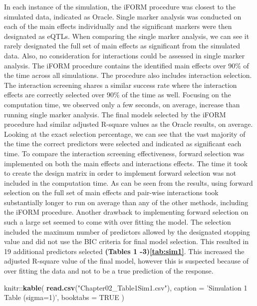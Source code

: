 \documentclass[11pt,]{book}
\newenvironment{Shaded}{\begin{snugshade}}{\end{snugshade}}
\newcommand{\KeywordTok}[1]{\textcolor[rgb]{0.13,0.29,0.53}{\textbf{{#1}}}}
\newcommand{\DataTypeTok}[1]{\textcolor[rgb]{0.13,0.29,0.53}{{#1}}}
\newcommand{\StringTok}[1]{\textcolor[rgb]{0.31,0.60,0.02}{{#1}}}
\newcommand{\OtherTok}[1]{\textcolor[rgb]{0.56,0.35,0.01}{{#1}}}
\newcommand{\NormalTok}[1]{{#1}}
\theoremstyle{definition}
\theoremstyle{definition}
\theoremstyle{remark}
\begin{document}
In each instance of the simulation, the iFORM procedure was closest to
the simulated data, indicated as Oracle. Single marker analysis was
conducted on each of the main effects individually and the significant
markers were then designated as eQTLs. When comparing the single marker
analysis, we can see it rarely designated the full set of main effects
as significant from the simulated data. Also, no consideration for
interactions could be assessed in single marker analysis. The iFORM
procedure contains the identified main effects over 90\% of the time
across all simulations. The procedure also includes interaction
selection. The interaction screening shares a similar success rate where
the interaction effects are correctly selected over 90\% of the time as
well. Focusing on the computation time, we observed only a few seconds,
on average, increase than running single marker analysis. The final
models selected by the iFORM procedure had similar adjusted R-square
values as the Oracle results, on average. Looking at the exact selection
percentage, we can see that the vast majority of the time the correct
predictors were selected and indicated as significant each time. To
compare the interaction screening effectiveness, forward selection was
implemented on both the main effects and interactions effects. The time
it took to create the design matrix in order to implement forward
selection was not included in the computation time. As can be seen from
the results, using forward selection on the full set of main effects and
pair-wise interactions took substantially longer to run on average than
any of the other methods, including the iFORM procedure. Another
drawback to implementing forward selection on such a large set seemed to
come with over fitting the model. The selection included the maximum
number of predictors allowed by the designated stopping value and did
not use the BIC criteria for final model selection. This resulted in 19
additional predictors selected \textbf{(Tables 1 -3)\ref{tab:sim1}}.
This increased the adjusted R-square value of the final model, however
this is suspected because of over fitting the data and not to be a true
prediction of the response.

\begin{Shaded}
\begin{Highlighting}[]
\NormalTok{knitr::}\KeywordTok{kable}\NormalTok{(}
  \KeywordTok{read.csv}\NormalTok{(}\StringTok{"Chapter02_Table1Sim1.csv"}\NormalTok{), }\DataTypeTok{caption =} \StringTok{'Simulation 1 Table (sigma=1)'}\NormalTok{,}
  \DataTypeTok{booktabs =} \OtherTok{TRUE}
\NormalTok{)}
\end{Highlighting}
\end{Shaded}
\end{document}
